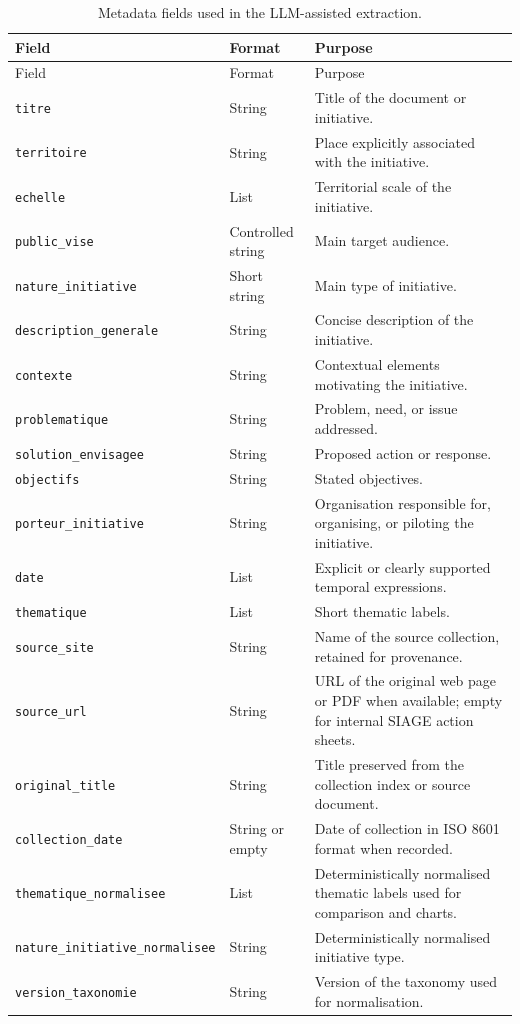 \documentclass[
11pt,
english,
singlespacing,
headsepline,
]{MastersDoctoralThesis}
\begin{document}
\begin{longtable}{@{}p{4.3cm}p{1.7cm}p{7.2cm}@{}}
\caption{Metadata fields used in the LLM-assisted extraction.}
\label{tab:appendix-schema}\\
\toprule
Field & Format & Purpose \\
\midrule
\endfirsthead
\toprule
Field & Format & Purpose \\
\midrule
\endhead
\bottomrule
\endfoot
\texttt{titre} & String & Title of the document or initiative. \\
\texttt{territoire} & String & Place explicitly associated with the initiative. \\
\texttt{echelle} & List & Territorial scale of the initiative. \\
\texttt{public\_vise} & Controlled string & Main target audience. \\
\texttt{nature\_initiative} & Short string & Main type of initiative. \\
\texttt{description\_generale} & String & Concise description of the initiative. \\
\texttt{contexte} & String & Contextual elements motivating the initiative. \\
\texttt{problematique} & String & Problem, need, or issue addressed. \\
\texttt{solution\_envisagee} & String & Proposed action or response. \\
\texttt{objectifs} & String & Stated objectives. \\
\texttt{porteur\_initiative} & String & Organisation responsible for, organising, or piloting the initiative. \\
\texttt{date} & List & Explicit or clearly supported temporal expressions. \\
\texttt{thematique} & List & Short thematic labels. \\
\texttt{source\_site} & String & Name of the source collection, retained for provenance. \\
\texttt{source\_url} & String & URL of the original web page or PDF when available; empty for internal SIAGE action sheets. \\
\texttt{original\_title} & String & Title preserved from the collection index or source document. \\
\texttt{collection\_date} & String or empty & Date of collection in ISO 8601 format when recorded. \\
\texttt{thematique\_normalisee} & List & Deterministically normalised thematic labels used for comparison and charts. \\
\texttt{nature\_\allowbreak initiative\_\allowbreak normalisee} & String & Deterministically normalised initiative type. \\
\texttt{version\_taxonomie} & String & Version of the taxonomy used for normalisation. \\
\end{longtable}
\end{document}
